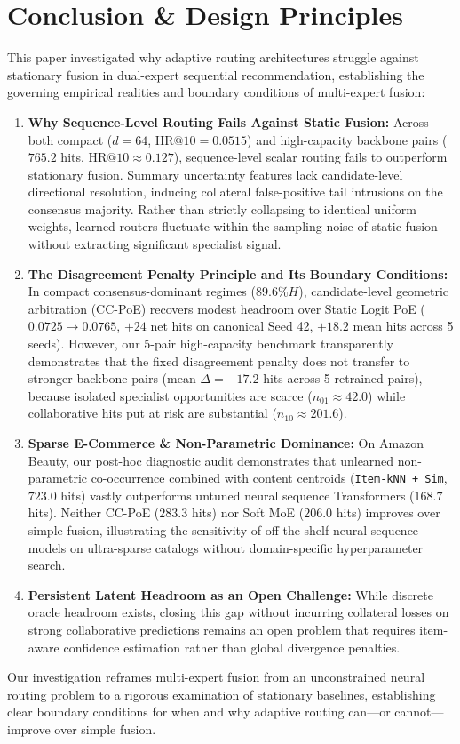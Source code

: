 
\section{Conclusion \& Design Principles}
\label{sec:conclusion}

This paper investigated why adaptive routing architectures struggle against stationary fusion in dual-expert sequential recommendation, establishing the governing empirical realities and boundary conditions of multi-expert fusion:
\begin{enumerate}[leftmargin=*]
    \item \textbf{Why Sequence-Level Routing Fails Against Static Fusion:} Across both compact ($d=64$, $\text{HR@10} = 0.0515$) and high-capacity backbone pairs ($765.2$ hits, $\text{HR@10} \approx 0.127$), sequence-level scalar routing fails to outperform stationary fusion. Summary uncertainty features lack candidate-level directional resolution, inducing collateral false-positive tail intrusions on the consensus majority. Rather than strictly collapsing to identical uniform weights, learned routers fluctuate within the sampling noise of static fusion without extracting significant specialist signal.
    \item \textbf{The Disagreement Penalty Principle and Its Boundary Conditions:} In compact consensus-dominant regimes ($89.6\% H$), candidate-level geometric arbitration (CC-PoE) recovers modest headroom over Static Logit PoE ($0.0725 \to 0.0765$, $+24$ net hits on canonical Seed 42, $+18.2$ mean hits across 5 seeds). However, our 5-pair high-capacity benchmark transparently demonstrates that the fixed disagreement penalty does not transfer to stronger backbone pairs (mean $\Delta = -17.2$ hits across 5 retrained pairs), because isolated specialist opportunities are scarce ($n_{01} \approx 42.0$) while collaborative hits put at risk are substantial ($n_{10} \approx 201.6$).
    \item \textbf{Sparse E-Commerce \& Non-Parametric Dominance:} On Amazon Beauty, our post-hoc diagnostic audit demonstrates that unlearned non-parametric co-occurrence combined with content centroids (\texttt{Item-kNN + Sim}, $723.0$ hits) vastly outperforms untuned neural sequence Transformers ($168.7$ hits). Neither CC-PoE ($283.3$ hits) nor Soft MoE ($206.0$ hits) improves over simple fusion, illustrating the sensitivity of off-the-shelf neural sequence models on ultra-sparse catalogs without domain-specific hyperparameter search.
    \item \textbf{Persistent Latent Headroom as an Open Challenge:} While discrete oracle headroom exists, closing this gap without incurring collateral losses on strong collaborative predictions remains an open problem that requires item-aware confidence estimation rather than global divergence penalties.
\end{enumerate}

Our investigation reframes multi-expert fusion from an unconstrained neural routing problem to a rigorous examination of stationary baselines, establishing clear boundary conditions for when and why adaptive routing can---or cannot---improve over simple fusion.
